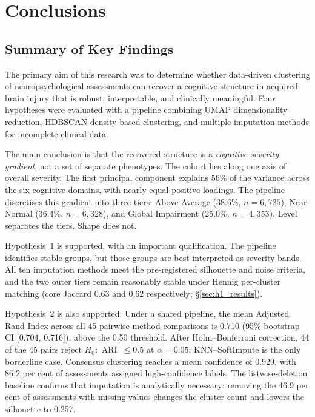 
\chapter{Conclusions}\label{Chapter7}


\section{Summary of Key Findings}

The primary aim of this research was to determine whether data-driven clustering of neuropsychological assessments can recover a cognitive structure in acquired brain injury that is robust, interpretable, and clinically meaningful. Four hypotheses were evaluated with a pipeline combining UMAP dimensionality reduction, HDBSCAN density-based clustering, and multiple imputation methods for incomplete clinical data.

The main conclusion is that the recovered structure is a \emph{cognitive severity gradient}, not a set of separate phenotypes. The cohort lies along one axis of overall severity. The first principal component explains 56\% of the variance across the six cognitive domains, with nearly equal positive loadings. The pipeline discretises this gradient into three tiers: Above-Average (38.6\%, $n = 6{,}725$), Near-Normal (36.4\%, $n = 6{,}328$), and Global Impairment (25.0\%, $n = 4{,}353$). Level separates the tiers. Shape does not.

Hypothesis~1 is supported, with an important qualification. The pipeline identifies stable groups, but those groups are best interpreted as severity bands. All ten imputation methods meet the pre-registered silhouette and noise criteria, and the two outer tiers remain reasonably stable under Hennig per-cluster matching (core Jaccard 0.63 and 0.62 respectively; §\ref{sec:h1_results}).

Hypothesis~2 is also supported. Under a shared pipeline, the mean Adjusted Rand Index across all 45 pairwise method comparisons is 0.710 (95\% bootstrap CI [0.704, 0.716]), above the 0.50 threshold. After Holm--Bonferroni correction, 44 of the 45 pairs reject $H_0$:~ARI~$\le 0.5$ at $\alpha = 0.05$; KNN--SoftImpute is the only borderline case. Consensus clustering reaches a mean confidence of 0.929, with 86.2 per cent of assessments assigned high-confidence labels. The listwise-deletion baseline confirms that imputation is analytically necessary: removing the 46.9 per cent of assessments with missing values changes the cluster count and lowers the silhouette to 0.257.

